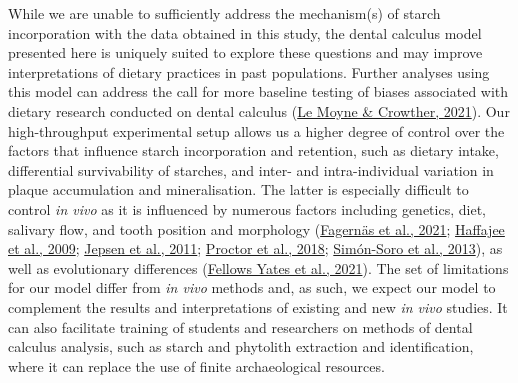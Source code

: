\documentclass[
  letterpaper,
]{book}
\begin{document}
While we are unable to sufficiently address the mechanism(s) of starch
incorporation with the data obtained in this study, the dental calculus
model presented here is uniquely suited to explore these questions and
may improve interpretations of dietary practices in past populations.
Further analyses using this model can address the call for more baseline
testing of biases associated with dietary research conducted on dental
calculus (\protect\hyperlink{ref-lemoyneCalculusPretreatments2021}{Le
Moyne \& Crowther, 2021}). Our high-throughput experimental setup allows
us a higher degree of control over the factors that influence starch
incorporation and retention, such as dietary intake, differential
survivability of starches, and inter- and intra-individual variation in
plaque accumulation and mineralisation. The latter is especially
difficult to control \emph{in vivo} as it is influenced by numerous
factors including genetics, diet, salivary flow, and tooth position and
morphology
(\protect\hyperlink{ref-fagernasMicrobialBiogeography2021}{Fagernäs et
al., 2021}; \protect\hyperlink{ref-haffajeeBiofilmPosition2009}{Haffajee
et al., 2009}; \protect\hyperlink{ref-jepsenCalculusRemoval2011}{Jepsen
et al., 2011};
\protect\hyperlink{ref-proctorSpatialGradient2018}{Proctor et al.,
2018}; \protect\hyperlink{ref-simonsoroOralGeography2013}{Simón-Soro et
al., 2013}), as well as evolutionary differences
(\protect\hyperlink{ref-yatesOralMicrobiome2021}{Fellows Yates et al.,
2021}). The set of limitations for our model differ from \emph{in vivo}
methods and, as such, we expect our model to complement the results and
interpretations of existing and new \emph{in vivo} studies. It can also
facilitate training of students and researchers on methods of dental
calculus analysis, such as starch and phytolith extraction and
identification, where it can replace the use of finite archaeological
resources.
\end{document}
